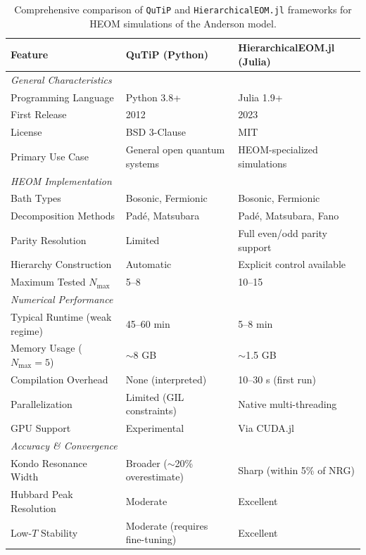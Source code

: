 \documentclass[preprint,1p]{elsarticle}
\begin{document}
\begin{table}[htbp]
\centering
\caption{Comprehensive comparison of \texttt{QuTiP} and \texttt{HierarchicalEOM.jl} frameworks for HEOM simulations of the Anderson model.}
\label{tab:framework_comparison}
\small
\begin{tabular}{@{}p{3.5cm}p{5.5cm}p{5.5cm}@{}}
\toprule
\textbf{Feature} & \textbf{QuTiP (Python)} & \textbf{HierarchicalEOM.jl (Julia)} \\
\midrule
\multicolumn{3}{l}{\textit{General Characteristics}} \\
\midrule
Programming Language & Python 3.8+ & Julia 1.9+ \\
First Release & 2012 & 2023 \\
License & BSD 3-Clause & MIT \\
Primary Use Case & General open quantum systems & HEOM-specialized simulations \\
\midrule
\multicolumn{3}{l}{\textit{HEOM Implementation}} \\
\midrule
Bath Types & Bosonic, Fermionic & Bosonic, Fermionic \\
Decomposition Methods & Padé, Matsubara & Padé, Matsubara, Fano \\
Parity Resolution & Limited & Full even/odd parity support \\
Hierarchy Construction & Automatic & Explicit control available \\
Maximum Tested $N_{\text{max}}$ & 5--8 & 10--15 \\
\midrule
\multicolumn{3}{l}{\textit{Numerical Performance}} \\
\midrule
Typical Runtime (weak regime) & 45--60 min & 5--8 min \\
Memory Usage ($N_{\text{max}}=5$) & $\sim$8 GB & $\sim$1.5 GB \\
Compilation Overhead & None (interpreted) & 10--30 s (first run) \\
Parallelization & Limited (GIL constraints) & Native multi-threading \\
GPU Support & Experimental & Via CUDA.jl \\
\midrule
\multicolumn{3}{l}{\textit{Accuracy \& Convergence}} \\
\midrule
Kondo Resonance Width & Broader ($\sim$20\% overestimate) & Sharp (within 5\% of NRG) \\
Hubbard Peak Resolution & Moderate & Excellent \\
Low-$T$ Stability & Moderate (requires fine-tuning) & Excellent \\

\end{tabular}
\end{table}
\end{document}
